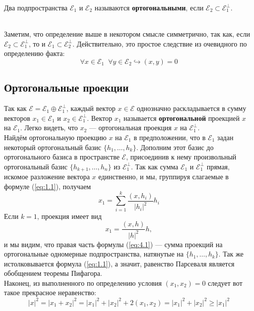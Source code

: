 \documentclass[11pt]{article}
\begin{document}
\begin{definition}
    Два подпространства $\mathcal{E}_1$ и $\mathcal{E}_2$ называются \textbf{ортогональными}, если $\mathcal{E}_2 \subset \mathcal{E}_1^{\perp}$.
\end{definition} \leavevmode
\\
Заметим, что определение выше в некотором смысле симметрично, так как, если $\mathcal{E}_2 \subset \mathcal{E}_1^{\perp}$, то и $\mathcal{E}_1 \subset \mathcal{E}_2^{\perp}$. Действительно, это простое следствие из очевидного по определению факта:
\[\forall x \in \mathcal{E}_1 \; \; \forall y \in \mathcal{E}_2 \hookrightarrow (x, y) = 0\]

\subsection{Ортогональные проекции}

Так как $\mathcal{E} =  \mathcal{E}_1 \oplus \mathcal{E}_1^{\perp}$, каждый вектор $x \in \mathcal{E}$ однозначно раскладывается в сумму векторов $x_1 \in \mathcal{E}_1$ и $x_2 \in \mathcal{E}_1^{\perp}$. Вектор $x_1$ называется \textbf{ортогональной} проекцией $x$ на $\mathcal{E}_1$. Легко видеть, что $x_2$ --- ортогональная проекция $x$ на $\mathcal{E}_1^{\perp}$. \\
Найдём ортогональную проекцию $x$ на $\mathcal{E}_1$ в предположении, что в $\mathcal{E}_1$ задан некоторый ортогональный базис $\{h_1, \ldots, h_k\}$. Дополним этот базис до ортогонального базиса в пространстве $\mathcal{E}$, присоединив к нему произвольный ортогональный базис $\{h_{k + 1}, \ldots, h_n\}$ из $\mathcal{E}_1^{\perp}$. Так как сумма $\mathcal{E}_1$ и $\mathcal{E}_1^{\perp}$ прямая, искомое разложение вектора $x$ единственно, и мы, группируя слагаемые в формуле (\ref{eq:1.1}), получаем
\begin{equation} \label{eq:4.1}
    x_1 = \sum_{i = 1}^k \frac{(x, h_i)}{\left\lvert h_i \right\rvert^2} h_i
\end{equation}
Если $k = 1$, проекция имеет вид 
\[x_1 = \frac{(x, h)}{\left\lvert h \right\rvert^2} h,\]
и мы видим, что правая часть формулы (\ref{eq:4.1}) --- сумма проекций на ортогональные одномерные подпространства, натянутые на $\{h_1, \ldots, h_k\}$. Так же истолковывается формула (\ref{eq:1.1}), а значит, равенство Парсеваля является обобщением теоремы Пифагора. \\
Наконец, из выполненного по определению условия $(x_1, x_2) = 0$ следует вот такое прекрасное неравенство:
\[\left\lvert x \right\rvert^2 = \left\lvert x_1 + x_2 \right\rvert^2 = \left\lvert x_1 \right\rvert^2 + \left\lvert x_2 \right\rvert^2 + 2(x_1, x_2) = \left\lvert x_1 \right\rvert^2 + \left\lvert x_2 \right\rvert^2 \geq \left\lvert x_1 \right\rvert^2 \]
\end{document}
